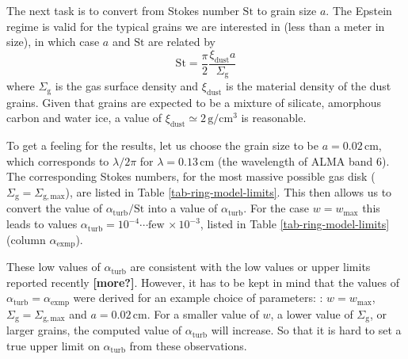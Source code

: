 \documentclass{aa}
\begin{document}

The next task is to convert from Stokes number $\mathrm{St}$ to grain size
$a$. The Epstein regime is valid for the typical grains we are interested in
(less than a meter in size), in which case $a$ and $\mathrm{St}$ are related
by 
\begin{equation}
\mathrm{St} = \frac{\pi}{2}\frac{\xi_{\mathrm{dust}}a}{\Sigma_{\mathrm{g}}}
\end{equation}
where $\Sigma_{\mathrm{g}}$ is the gas surface density and $\xi_{\mathrm{dust}}$
is the material density of the dust grains. Given that grains are expected
to be a mixture of silicate, amorphous carbon and water ice, a value of
$\xi_{\mathrm{dust}}\simeq 2\,\mathrm{g}/\mathrm{cm}^3$ is reasonable.

To get a feeling for the results, let us choose the grain size to be
$a=0.02\,\mathrm{cm}$, which corresponds to $\lambda/2\pi$ for
$\lambda=0.13\,\mathrm{cm}$ (the wavelength of ALMA band 6).  The corresponding
Stokes numbers, for the most massive possible gas disk
($\Sigma_{\mathrm{g}}=\Sigma_{\mathrm{g,max}}$), are listed in Table
\ref{tab-ring-model-limits}. This then allows us to convert the value of
$\alpha_{\mathrm{turb}}/\mathrm{St}$ into a value of
$\alpha_{\mathrm{turb}}$. For the case $w=w_{\mathrm{max}}$ this leads to values
$\alpha_{\mathrm{turb}}= 10^{-4}\cdots\mathrm{few}\,\times 10^{-3}$, listed in
Table \ref{tab-ring-model-limits} (column $\alpha_{\mathrm{exmp}}$).

These low values of $\alpha_{\mathrm{turb}}$ are consistent with the low values
or upper limits reported recently \citep{2016ApJ...816...25P,
  2018ApJ...856..117F} {\bf [more?]}. However, it has to be kept in mind that
the values of $\alpha_{\mathrm{turb}}=\alpha_{\mathrm{exmp}}$ were derived
for an example choice of parameters: : $w=w_{\mathrm{max}}$,
$\Sigma_{\mathrm{g}}=\Sigma_{\mathrm{g,max}}$ and $a=0.02\,\mathrm{cm}$. For a
smaller value of $w$, a lower value of $\Sigma_{\mathrm{g}}$, or larger grains,
the computed value of $\alpha_{\mathrm{turb}}$ will increase. So that it is hard
to set a true upper limit on $\alpha_{\mathrm{turb}}$ from these observations.
\end{document}
